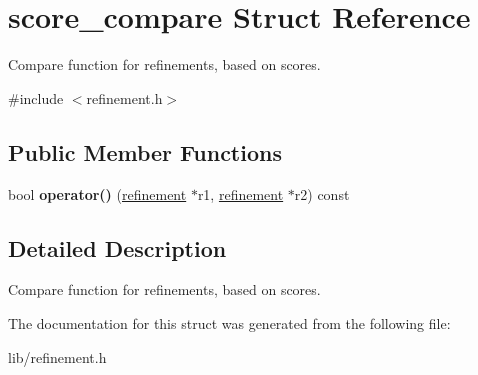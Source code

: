 \hypertarget{structscore__compare}{}\section{score\+\_\+compare Struct Reference}
\label{structscore__compare}


Compare function for refinements, based on scores.  




{\ttfamily \#include $<$refinement.\+h$>$}

\subsection*{Public Member Functions}
\begin{DoxyCompactItemize}
\item 
bool {\bfseries operator()} (\hyperlink{classrefinement}{refinement} $\ast$r1, \hyperlink{classrefinement}{refinement} $\ast$r2) const \hypertarget{structscore__compare_a661973d33cfceb1dee63464cf2173f30}{}\label{structscore__compare_a661973d33cfceb1dee63464cf2173f30}

\end{DoxyCompactItemize}


\subsection{Detailed Description}
Compare function for refinements, based on scores. 

The documentation for this struct was generated from the following file\+:\begin{DoxyCompactItemize}
\item 
lib/refinement.\+h\end{DoxyCompactItemize}
